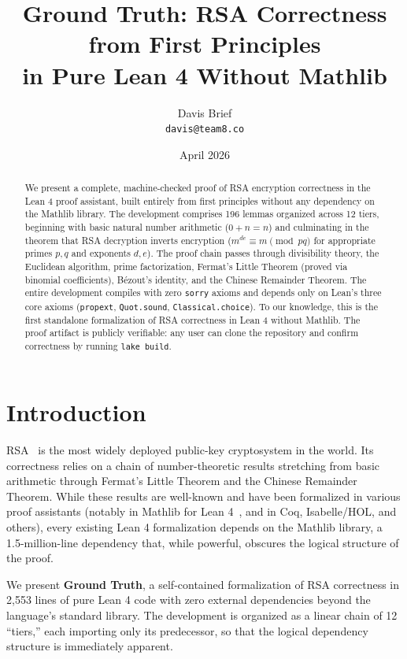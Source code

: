 \documentclass[11pt]{article}
\title{\textbf{Ground Truth: RSA Correctness from First Principles\\in Pure Lean 4 Without Mathlib}}
\author{Davis Brief\\\texttt{davis@team8.co}}
\date{April 2026}
\begin{document}
\maketitle

\begin{abstract}
We present a complete, machine-checked proof of RSA encryption correctness in the Lean 4 proof assistant, built entirely from first principles without any dependency on the Mathlib library. The development comprises 196 lemmas organized across 12 tiers, beginning with basic natural number arithmetic ($0 + n = n$) and culminating in the theorem that RSA decryption inverts encryption ($m^{de} \equiv m \pmod{pq}$ for appropriate primes $p, q$ and exponents $d, e$). The proof chain passes through divisibility theory, the Euclidean algorithm, prime factorization, Fermat's Little Theorem (proved via binomial coefficients), B\'{e}zout's identity, and the Chinese Remainder Theorem. The entire development compiles with zero \texttt{sorry} axioms and depends only on Lean's three core axioms (\texttt{propext}, \texttt{Quot.sound}, \texttt{Classical.choice}). To our knowledge, this is the first standalone formalization of RSA correctness in Lean 4 without Mathlib. The proof artifact is publicly verifiable: any user can clone the repository and confirm correctness by running \texttt{lake build}.
\end{abstract}

\section{Introduction}

RSA~\cite{rsa1978} is the most widely deployed public-key cryptosystem in the world. Its correctness relies on a chain of number-theoretic results stretching from basic arithmetic through Fermat's Little Theorem and the Chinese Remainder Theorem. While these results are well-known and have been formalized in various proof assistants (notably in Mathlib for Lean 4~\cite{mathlib}, and in Coq, Isabelle/HOL, and others), every existing Lean 4 formalization depends on the Mathlib library, a 1.5-million-line dependency that, while powerful, obscures the logical structure of the proof.

We present \textbf{Ground Truth}, a self-contained formalization of RSA correctness in 2,553 lines of pure Lean 4 code with zero external dependencies beyond the language's standard library. The development is organized as a linear chain of 12 ``tiers,'' each importing only its predecessor, so that the logical dependency structure is immediately apparent.
\end{document}
